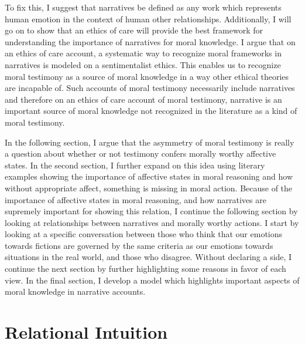 \documentclass[12pt]{book}
\theoremstyle{definition}
\theoremstyle{remark}
\begin{document}
To fix this, I suggest that narratives be defined as any work which represents human emotion in the context of human other relationships. Additionally, I will go on to show that an ethics of care will provide the best framework for understanding the importance of narratives for moral knowledge. I argue that on an ethics of care account, a systematic way to recognize moral frameworks in narratives is modeled on a sentimentalist ethics. This enables us to recognize moral testimony as a source of moral knowledge in a way other ethical theories are incapable of. Such accounts of moral testimony necessarily include narratives and therefore on an ethics of care account of moral testimony, narrative is an important source of moral knowledge not recognized in the literature as a kind of moral testimony.

In the following section, I argue that the asymmetry of moral testimony is really a question about whether or not testimony confers morally worthy affective states. In the second section, I further expand on this idea using literary examples showing the importance of affective states in moral reasoning and how without appropriate affect, something is missing in moral action. Because of the importance of affective states in moral reasoning, and how narratives are supremely important for showing this relation, I continue the following section by looking at relationships between narratives and morally worthy actions. I start by looking at a specific conversation between those who think that our emotions towards fictions are governed by the same criteria as our emotions towards situations in the real world, and those who disagree. Without declaring a side, I continue the next section by further highlighting some reasons in favor of each view. In the final section, I develop a model which highlights important aspects of moral knowledge in narrative accounts.

\chapter{Relational Intuition}\label{rel-int}
\end{document}
